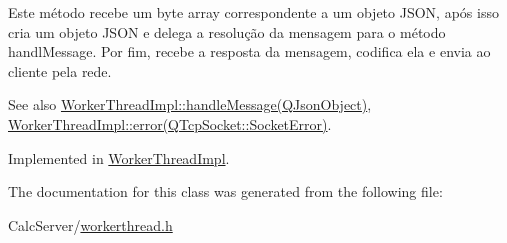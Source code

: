 Este método recebe um byte array correspondente a um objeto J\+S\+ON, após isso cria um objeto J\+S\+ON e delega a resolução da mensagem para o método handl\+Message. Por fim, recebe a resposta da mensagem, codifica ela e envia ao cliente pela rede.

\begin{DoxySeeAlso}{See also}
\hyperlink{classWorkerThreadImpl_ac1ced60fd043f7dca8a7e7e1857a91cb}{Worker\+Thread\+Impl\+::handle\+Message(\+Q\+Json\+Object)}, \hyperlink{classWorkerThreadImpl_ae260562530b71dc55a6d360d5e4d896d}{Worker\+Thread\+Impl\+::error(\+Q\+Tcp\+Socket\+::\+Socket\+Error)}. 
\end{DoxySeeAlso}


Implemented in \hyperlink{classWorkerThreadImpl_a24ef315ed0b7914ffd099c23a5a6e16c}{Worker\+Thread\+Impl}.



The documentation for this class was generated from the following file\+:\begin{DoxyCompactItemize}
\item 
Calc\+Server/\hyperlink{workerthread_8h}{workerthread.\+h}\end{DoxyCompactItemize}
